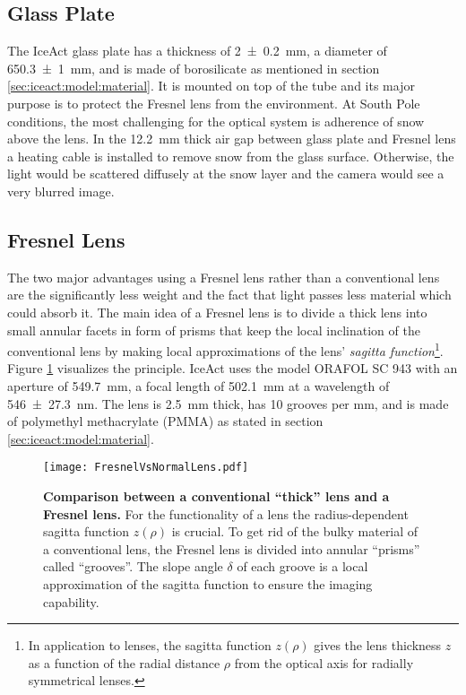\subsection{Glass Plate}\label{iceact:model:glassplate}

The IceAct glass plate has a thickness of \SI{2+-0.2}{\milli\meter}, a diameter of \SI{650.3+-1}{\milli\meter}, and is made of borosilicate as mentioned in section \ref{sec:iceact:model:material}. It is mounted on top of the tube and its major purpose is to protect the Fresnel lens from the environment. At South Pole conditions, the most challenging for the optical system is adherence of snow above the lens. In the \SI{12.2}{\milli\meter} thick air gap between glass plate and Fresnel lens a heating cable is installed to remove snow from the glass surface. Otherwise, the light would be scattered diffusely at the snow layer and the camera would see a very blurred image.

\subsection{Fresnel Lens}\label{iceact:model:fresnellens}

The two major advantages using a Fresnel lens rather than a conventional lens are the significantly less weight and the fact that light passes less material which could absorb it. The main idea of a Fresnel lens is to divide a thick lens into small annular facets in form of prisms that keep the local inclination of the conventional lens by making local approximations of the lens' \textit{sagitta function}\footnote{In application to lenses, the sagitta function $z(\rho)$ gives the lens thickness $z$ as a function of the radial distance $\rho$ from the optical axis for radially symmetrical lenses.}. Figure \ref{iceact:model:fresnelvsthick} visualizes the principle. IceAct uses the model ORAFOL SC 943 with an aperture of \SI{549.7}{\milli\meter}, a focal length of \SI{502.1}{\milli\meter} at a wavelength of \SI{546+-27.3}{\nano\meter}. The lens is \SI{2.5}{\milli\meter} thick, has 10 grooves per \si{\milli\meter}, and is made of polymethyl methacrylate (PMMA) as stated in section \ref{sec:iceact:model:material}. \cite{iceact:fresnellens:datasheet}

\begin{figure}[h]
	\centering
	\texttt{[image: FresnelVsNormalLens.pdf]}
	\caption[Comparison conventional vs. Fresnel lens]{\textbf{Comparison between a conventional \enquote{thick} lens and a Fresnel lens.} \cite{famous:eichler} For the functionality of a lens the radius-dependent sagitta function $z(\rho)$ is crucial. To get rid of the bulky material of a conventional lens, the Fresnel lens is divided into annular \enquote{prisms} called \enquote{grooves}. The slope angle $\delta$ of each groove is a local approximation of the sagitta function to ensure the imaging capability.}
	\label{iceact:model:fresnelvsthick}	
\end{figure}

